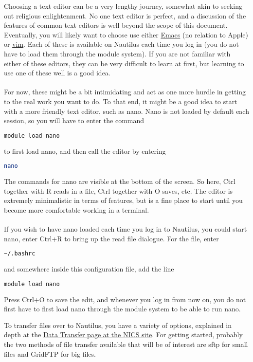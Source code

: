 Choosing a text editor can be a very lengthy journey, somewhat akin to seeking out religious enlightenment.  No one text editor is perfect, and a discussion of the features of common text editors is well beyond the scope of this document.  Eventually, you will likely want to choose use either \href{https://www.gnu.org/software/emacs/}{Emacs} (no relation to Apple) or \href{http://www.vim.org/}{vim}.  Each of these is available on Nautilus each time you log in (you do not have to load them through the module system).  If you are not familiar with either of these editors, they can be very difficult to learn at first, but learning to use one of these well is a good idea.\\\\
%
For now, these might be a bit intimidating and act as one more hurdle in getting to the real work you want to do.  To that end, it might be a good idea to start with a more friendly text editor, such as nano.  Nano is not loaded by default each session, so you will have to enter the command
\begin{lstlisting}[language=sh]
module load nano
\end{lstlisting}%
to first load nano, and then call the editor by entering
\begin{lstlisting}[language=sh]
nano
\end{lstlisting}%
The commands for nano are visible at the bottom of the screen.  So here, Ctrl together with R reads in a file, Ctrl together with O saves, etc.  The editor is extremely minimalistic in terms of features, but is a fine place to start until you become more comfortable working in a terminal. \\\\
If you wish to have nano loaded each time you log in to Nautilus, you could start nano, enter Ctrl+R to bring up the read file dialogue.  For the file, enter
\begin{lstlisting}[language=sh]
~/.bashrc
\end{lstlisting}%
and somewhere inside this configuration file, add the line
\begin{lstlisting}[language=sh]
module load nano
\end{lstlisting}%
Press Ctrl+O to save the edit, and whenever you log in from now on, you do not first have to first load nano through the module system to be able to run nano.

To transfer files over to Nautilus, you have a variety of options, explained in depth at the \href{http://www.nics.tennessee.edu/computing-resources/data-transfer}{Data Transfer page at the NICS site}.  For getting started, probably the two methods of file transfer available that will be of interest are sftp for small files and GridFTP for big files.

